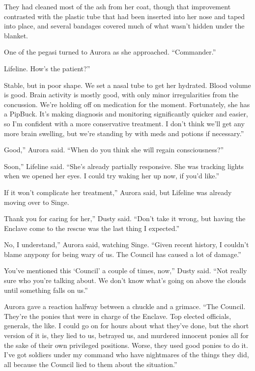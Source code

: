They had cleaned most of the ash from her coat, though that improvement contrasted with the plastic tube that had been inserted into her nose and taped into place, and several bandages covered much of what wasn’t hidden under the blanket.

One of the pegasi turned to Aurora as she approached. “Commander.”

\leavevmode{}Lifeline. How’s the patient?”

\leavevmode{}Stable, but in poor shape. We set a nasal tube to get her hydrated. Blood volume is good. Brain activity is mostly good, with only minor irregularities from the concussion. We’re holding off on medication for the moment. Fortunately, she has a PipBuck. It’s making diagnosis and monitoring significantly quicker and easier, so I’m confident with a more conservative treatment. I don’t think we’ll get any more brain swelling, but we’re standing by with meds and potions if necessary.”

\leavevmode{}Good,” Aurora said. “When do you think she will regain consciousness?”

\leavevmode{}Soon,” Lifeline said. “She’s already partially responsive. She was tracking lights when we opened her eyes. I could try waking her up now, if you’d like.”

\leavevmode{}If it won’t complicate her treatment,” Aurora said, but Lifeline was already moving over to Singe.

\leavevmode{}Thank you for caring for her,” Dusty said. “Don’t take it wrong, but having the Enclave come to the rescue was the last thing I expected.”

\leavevmode{}No, I understand,” Aurora said, watching Singe. “Given recent history, I couldn’t blame anypony for being wary of us. The Council has caused a lot of damage.”

\leavevmode{}You’ve mentioned this ‘Council’ a couple of times, now,” Dusty said. “Not really sure who you’re talking about. We don’t know what’s going on above the clouds until something falls on us.”

Aurora gave a reaction halfway between a chuckle and a grimace. “The Council. They’re the ponies that were in charge of the Enclave. Top elected officials, generals, the like. I could go on for hours about what they’ve done, but the short version of it is, they lied to us, betrayed us, and murdered innocent ponies all for the sake of their own privileged positions. Worse, they used good ponies to do it. I’ve got soldiers under my command who have nightmares of the things they did, all because the Council lied to them about the situation.”

